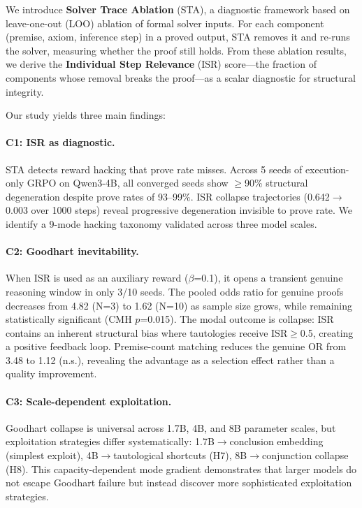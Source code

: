 \documentclass[11pt]{article}
\begin{document}
We introduce \textbf{Solver Trace Ablation} (STA), a diagnostic framework based on leave-one-out (LOO) ablation of formal solver inputs. For each component (premise, axiom, inference step) in a proved output, STA removes it and re-runs the solver, measuring whether the proof still holds. From these ablation results, we derive the \textbf{Individual Step Relevance} (ISR) score---the fraction of components whose removal breaks the proof---as a scalar diagnostic for structural integrity.

Our study yields three main findings:

\paragraph{C1: ISR as diagnostic.} STA detects reward hacking that prove rate misses. Across 5 seeds of execution-only GRPO on Qwen3-4B, all converged seeds show $\geq$90\% structural degeneration despite prove rates of 93--99\%. ISR collapse trajectories (0.642$\to$0.003 over 1000 steps) reveal progressive degeneration invisible to prove rate. We identify a 9-mode hacking taxonomy validated across three model scales.

\paragraph{C2: Goodhart inevitability.} When ISR is used as an auxiliary reward ($\beta$=0.1), it opens a transient genuine reasoning window in only 3/10 seeds. The pooled odds ratio for genuine proofs decreases from 4.82 (N=3) to 1.62 (N=10) as sample size grows, while remaining statistically significant (CMH $p$=0.015). The modal outcome is collapse: ISR contains an inherent structural bias where tautologies receive ISR$\geq$0.5, creating a positive feedback loop. Premise-count matching reduces the genuine OR from 3.48 to 1.12 (n.s.), revealing the advantage as a selection effect rather than a quality improvement.

\paragraph{C3: Scale-dependent exploitation.} Goodhart collapse is universal across 1.7B, 4B, and 8B parameter scales, but exploitation strategies differ systematically: 1.7B$\to$conclusion embedding (simplest exploit), 4B$\to$tautological shortcuts (H7), 8B$\to$conjunction collapse (H8). This capacity-dependent mode gradient demonstrates that larger models do not escape Goodhart failure but instead discover more sophisticated exploitation strategies.
\end{document}

